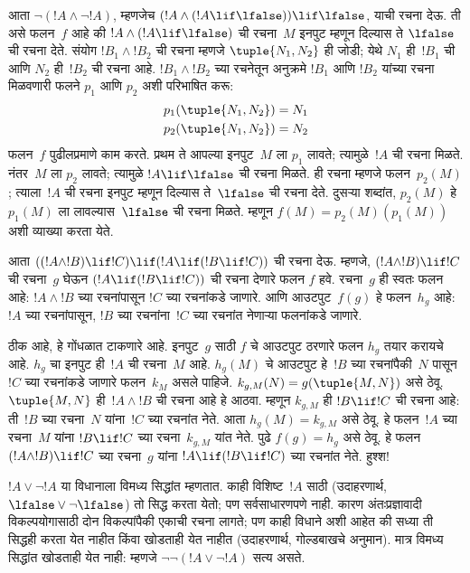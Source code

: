 \documentclass[../../../include/open-logic-section]{subfiles}
\begin{document}
\begin{ex}
आता $\lnot(!A \land \lnot !A)$, म्हणजेच $(!A
\land (!A \lif \lfalse)) \lif \lfalse$, याची रचना
देऊ. ती असे फलन~$f$ आहे की $!A \land (!A \lif
\lfalse)$ ची रचना~$M$ इनपुट म्हणून दिल्यास ते
$\lfalse$ ची रचना देते. संयोग $!B_1 \land !B_2$
ची रचना म्हणजे $\tuple{N_1, N_2}$ ही जोडी; येथे
$N_1$ ही~$!B_1$ ची आणि $N_2$ ही~$!B_2$ ची
रचना आहे. $!B_1 \land !B_2$ च्या रचनेतून
अनुक्रमे $!B_1$ आणि $!B_2$ यांच्या रचना मिळवणारी
फलने $p_1$ आणि $p_2$ अशी परिभाषित करू:
\begin{align*}
  p_1(\tuple{N_1, N_2}) &= N_1\\
  p_2(\tuple{N_1, N_2}) &= N_2
\end{align*}
फलन~$f$ पुढीलप्रमाणे काम करते. प्रथम ते आपल्या
इनपुट~$M$ ला $p_1$ लावते; त्यामुळे~$!A$ ची रचना
मिळते. नंतर~$M$ ला $p_2$ लावते; त्यामुळे
$!A \lif \lfalse$ ची रचना मिळते. ही रचना म्हणजे
फलन~$p_2(M)$; त्याला~$!A$ ची रचना इनपुट म्हणून
दिल्यास ते~$\lfalse$ ची रचना देते. दुसऱ्या शब्दांत,
$p_2(M)$ हे $p_1(M)$ ला लावल्यास~$\lfalse$ ची
रचना मिळते. म्हणून $f(M) = p_2(M)(p_1(M))$ अशी
व्याख्या करता येते.
\end{ex}

\begin{ex}
आता $((!A \land !B) \lif !C) \lif (!A \lif
(!B \lif !C))$ ची रचना देऊ. म्हणजे, $(!A \land
!B) \lif !C$ ची रचना~$g$ घेऊन $(!A \lif (!B \lif
!C))$ ची रचना देणारे फलन $f$ हवे. रचना~$g$
ही स्वतः फलन आहे: $!A \land !B$ च्या रचनांपासून
$!C$ च्या रचनांकडे जाणारे. आणि आउटपुट~$f(g)$
हे फलन~$h_g$ आहे: $!A$ च्या रचनांपासून, $!B$
च्या रचनांना~$!C$ च्या रचनांत नेणाऱ्या फलनांकडे जाणारे.

ठीक आहे, हे गोंधळात टाकणारे आहे. इनपुट~$g$ साठी
$f$ चे आउटपुट ठरणारे फलन $h_g$ तयार करायचे आहे.
$h_g$ चा इनपुट ही~$!A$ ची रचना~$M$ आहे.
$h_g(M)$ चे आउटपुट हे~$!B$ च्या रचनांपैकी~$N$
पासून~$!C$ च्या रचनांकडे जाणारे फलन~$k_M$ असले
पाहिजे. $k_{g,M}(N) = g(\tuple{M, N})$ असे ठेवू.
$\tuple{M, N}$ ही~$!A \land !B$ ची रचना आहे हे
आठवा. म्हणून $k_{g,M}$ ही $!B \lif !C$ ची रचना
आहे: ती~$!B$ च्या रचना~$N$ यांना~$!C$ च्या
रचनांत नेते. आता $h_g(M) = k_{g,M}$ असे ठेवू.
हे फलन~$!A$ च्या रचना~$M$ यांना $!B
\lif !C$ च्या रचना~$k_{g,M}$ यांत नेते. पुढे
$f(g) = h_g$ असे ठेवू. हे फलन $(!A \land !B)
\lif !C$ च्या रचना~$g$ यांना $!A \lif (!B \lif !C)$
च्या रचनांत नेते. हुश्श!{}
\end{ex}

$!A \lor \lnot !A$ या विधानाला विमध्य सिद्धांत
म्हणतात. काही विशिष्ट~$!A$ साठी (उदाहरणार्थ,
$\lfalse \lor \lnot \lfalse$) तो सिद्ध करता येतो;
पण सर्वसाधारणपणे नाही. कारण अंतःप्रज्ञावादी
विकल्पयोगासाठी दोन विकल्पांपैकी एकाची रचना लागते;
पण काही विधाने अशी आहेत की सध्या ती सिद्धही
करता येत नाहीत किंवा खोडताही येत नाहीत
(उदाहरणार्थ, गोल्डबाखचे अनुमान). मात्र विमध्य
सिद्धांत खोडताही येत नाही: म्हणजे $\lnot \lnot (!A
\lor \lnot !A)$ सत्य असते.
\end{document}
